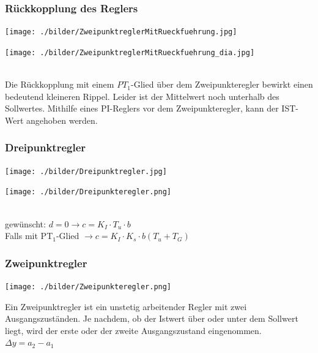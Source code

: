 		\subsubsection{Rückkopplung des Reglers}
		\begin{minipage}{9cm}
		\texttt{[image: ./bilder/ZweipunktreglerMitRueckfuehrung.jpg]}
        \end{minipage}
		\begin{minipage}{7.5cm}
        \texttt{[image: ./bilder/ZweipunktreglerMitRueckfuehrung\_dia.jpg]}
        \end{minipage}\\
		Die Rückkopplung mit einem $PT_1$-Glied über dem Zweipunkteregler bewirkt
		einen bedeutend kleineren Rippel. Leider ist der Mittelwert noch unterhalb des
		Sollwertes. Mithilfe eines PI-Reglers vor dem Zweipunkteregler, kann der IST-Wert
		angehoben werden.
	
	\subsubsection{Dreipunktregler}
		\begin{minipage}{9cm}
		\texttt{[image: ./bilder/Dreipunktregler.jpg]}
        \end{minipage}
		\begin{minipage}{7.5cm}
        \texttt{[image: ./bilder/Dreipunkteregler.png]}
        \end{minipage}\\
		gewünscht: $d = 0 \rightarrow c = K_I \cdot T_u \cdot b$\\
		Falls mit PT$_1$-Glied $\rightarrow c = K_I \cdot K_s \cdot b (T_u + T_G)$
		
		
	\subsubsection{Zweipunktregler}
		\begin{minipage}{3cm}
 		\texttt{[image: ./bilder/Zweipunkteregler.png]}
        \end{minipage}
		\begin{minipage}{15cm}
        Ein Zweipunktregler ist ein unstetig arbeitender Regler mit zwei
        Ausgangszuständen. Je nachdem, ob der Istwert über oder unter dem
        Sollwert liegt, wird der erste oder der zweite Ausgangszustand
        eingenommen.\\
				$\Delta y = a_2 - a_1$
        \end{minipage}

